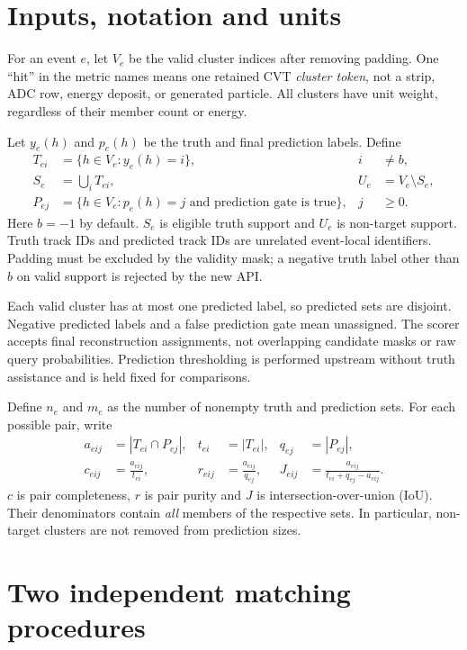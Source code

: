 \documentclass[11pt,letterpaper]{article}
\newcommand{\ratio}[2]{\frac{#1}{#2}}
\begin{document}
\section{Inputs, notation and units}

For an event $e$, let $V_e$ be the valid cluster indices after removing padding.
One ``hit'' in the metric names means one retained CVT \emph{cluster token}, not a
strip, ADC row, energy deposit, or generated particle. All clusters have unit
weight, regardless of their member count or energy.

Let $y_e(h)$ and $p_e(h)$ be the truth and final prediction labels. Define
\begin{align}
 T_{ei} &= \{h\in V_e:y_e(h)=i\}, & i&\ne b,\\
 S_e &= \bigcup_i T_{ei}, & U_e&=V_e\setminus S_e,\\
 P_{ej} &= \{h\in V_e:p_e(h)=j\text{ and prediction gate is true}\}, & j&\ge0.
\end{align}
Here $b=-1$ by default. $S_e$ is eligible truth support and $U_e$ is non-target
support. Truth track IDs and predicted track IDs are unrelated event-local
identifiers. Padding must be excluded by the validity mask; a negative truth
label other than $b$ on valid support is rejected by the new API.

Each valid cluster has at most one predicted label, so predicted sets are
disjoint. Negative predicted labels and a false prediction gate mean unassigned.
The scorer accepts final reconstruction assignments, not overlapping candidate
masks or raw query probabilities. Prediction thresholding is performed upstream
without truth assistance and is held fixed for comparisons.

Define $n_e$ and $m_e$ as the number of nonempty truth and prediction sets. For
each possible pair, write
\begin{align}
 a_{eij}&=|T_{ei}\cap P_{ej}|,& t_{ei}&=|T_{ei}|,& q_{ej}&=|P_{ej}|,\\
 c_{eij}&=\ratio{a_{eij}}{t_{ei}},& r_{eij}&=\ratio{a_{eij}}{q_{ej}},&
 J_{eij}&=\ratio{a_{eij}}{t_{ei}+q_{ej}-a_{eij}}.
\end{align}
$c$ is pair completeness, $r$ is pair purity and $J$ is intersection-over-union
(IoU). Their denominators contain \emph{all} members of the respective sets.
In particular, non-target clusters are not removed from prediction sizes.

\section{Two independent matching procedures}
\end{document}
